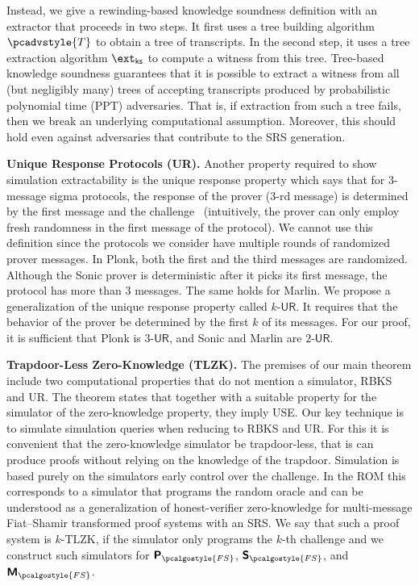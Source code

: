 \documentclass[10pt]{llncs}
\newcommand{\pcvarstyle}[1]{\mathsf{#1}}
\newcommand{\fs}{\pcalgostyle{FS}}
\newcommand{\pcschemestyle}[1]{\bm{\mathsf{#1}}}
\newcommand{\plonkprotfs}{\pcschemestyle{P}_\fs}
\newcommand{\sonicprotfs}{\pcschemestyle{S}_\fs}
\newcommand{\marlinprotfs}{\pcschemestyle{M}_\fs}
\newcommand{\tdv}{\pcadvstyle{T}}
\newcommand{\ur}[1]{{#1\text{-}\mathsf{UR}}}
\newcommand{\extcss}{\ext_{\css}}
\newcommand{\css}{\pcvarstyle{ks}}
\newcommand{\oursubsub}[1] {\smallskip\noindent\textbf{#1}}
\begin{document}
Instead, we give a rewinding-based knowledge soundness definition with an extractor that proceeds in two steps. It first uses a tree building algorithm $\tdv$ to obtain a tree of transcripts. In the second step, it uses a tree extraction algorithm $\extcss$ to compute a witness from this tree. Tree-based knowledge soundness guarantees that it is possible to extract a witness from all
(but negligibly many) trees of accepting transcripts produced by probabilistic
polynomial time (PPT) adversaries. That
is, if extraction from such a tree fails, then we break an underlying
computational assumption. Moreover, this should hold even against adversaries
that contribute to the SRS generation.

\oursubsub{Unique Response Protocols (UR).}  Another property
required to show simulation extractability is the unique response property which says
that for $3$-message sigma protocols, the response of the prover ($3$-rd message) is determined by the first message and the challenge~\cite{C:Fischlin05} (intuitively, the prover can only employ fresh randomness in the first
message of the protocol). We cannot use this definition since the protocols
we consider have multiple rounds of randomized prover messages. In
Plonk, both the first and the third messages are randomized. Although the Sonic prover
is deterministic after it picks its first message, the protocol has more than $3$
messages. The same holds for Marlin. We propose a generalization of the unique response property called $\ur{k}$. It requires that the behavior of the prover be determined by the first
$k$ of its messages. For our proof, it is sufficient that Plonk is $\ur{3}$, and Sonic and Marlin are $\ur{2}$.


\oursubsub{Trapdoor-Less Zero-Knowledge (TLZK).} 
The premises of our main theorem include two computational properties that do not mention a simulator, RBKS and UR. The theorem states that together with a suitable property for the simulator of the zero-knowledge property, they imply USE.
%
Our key technique is to simulate simulation queries when reducing to RBKS and UR. For this it is convenient that the zero-knowledge simulator be trapdoor-less, that is can produce proofs without relying on the
knowledge of the trapdoor. Simulation is based purely on the simulators early control over the challenge. 
%
In the ROM this corresponds to a simulator that programs the random oracle and can be understood as a generalization of
honest-verifier zero-knowledge for multi-message Fiat--Shamir transformed proof systems with an
SRS. We say that such a proof system is $k$-TLZK, if the simulator only programs the $k$-th challenge and we construct such simulators for $\plonkprotfs$, $\sonicprotfs$, and $\marlinprotfs$. 
\end{document}
